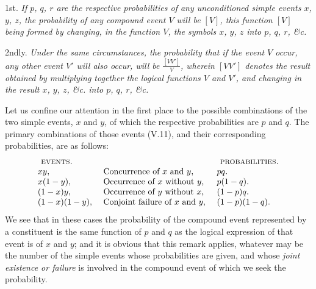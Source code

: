 \documentclass[oneside]{book}
\begin{document}
1st. \emph{If $p$, $q$, $r$ are the respective probabilities of any unconditioned
simple events $x$, $y$, $z$, the probability of any compound
event $V$ will be $[V]$, this function $[V]$ being formed by changing,
in the function $V$, the symbols $x$, $y$, $z$ into $p$, $q$, $r$, \&c.}

2ndly. \emph{Under the same circumstances, the probability that if
the event $V$ occur, any other event $V'$ will also occur, will be
$\frac{[VV']}{V}$, wherein $[VV']$ denotes the result obtained by multiplying
together the logical functions $V$ and $V'$, and changing in the result
$x$, $y$, $z$, \&c. into $p$, $q$, $r$, \&c.}

Let us confine our attention in the first place to the
possible combinations of the two simple events, $x$ and $y$, of which the
respective probabilities are $p$ and $q$. The primary combinations
of those events (V.11), and their corresponding probabilities, are
as follows:
\[
\begin{array}{lll}
 \textsc{ events.}&  &\textsc{ probabilities.}\\
 xy,         &\text{ Concurrence of $x$ and $y$, }     &pq.\\
 x(1-y),     &\text{ Occurrence of $x$ without $y$, }  &p(1-q). \\
 (1-x)y,     &\text{ Occurrence of $y$ without $x$, }  &(1-p)q. \\
 (1-x)(1-y), &\text{ Conjoint failure of $x$ and $y$, }&(1-p)(1-q).\\
\end{array}
\]
We see that in these cases the probability of the compound event
represented by a constituent is the same function of $p$ and $q$ as
the logical expression of that event is of $x$ and $y$; and it is obvious
that this remark applies, whatever may be the number of the
simple events whose probabilities are given, and whose \emph{joint existence
or failure} is involved in the compound event of which we
seek the probability.
\end{document}
